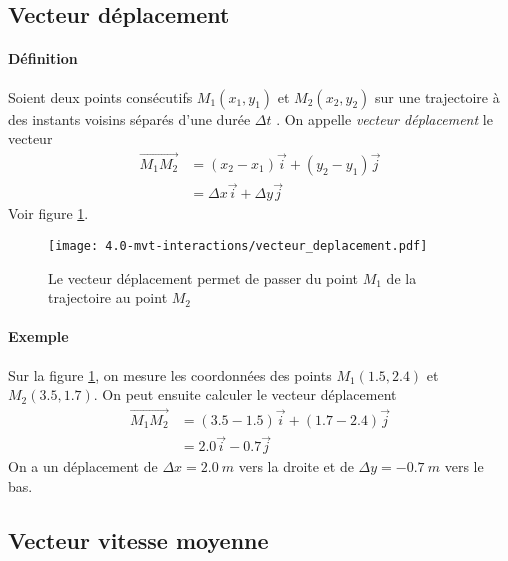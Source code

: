 \subsection{Vecteur déplacement}
\paragraph{Définition} Soient deux points consécutifs $M_1(x_1,y_1)$ et $M_2(x_2,y_2)$  sur une trajectoire à des instants voisins séparés d'une durée $\Delta t$ . On appelle \textit{vecteur déplacement} le vecteur 
\begin{equation*}
  \begin{aligned}
    \overrightarrow{M_1M_2} & = (x_2-x_1) \overrightarrow i + (y_2-y_1) \overrightarrow j \\
			    & = \Delta x \overrightarrow i + \Delta y  \overrightarrow j
 \end{aligned} 
\end{equation*}
Voir figure \ref{fig:vecteur_deplacement}.
\begin{figure}[h!]
  \begin{center}
      \texttt{[image: 4.0-mvt-interactions/vecteur\_deplacement.pdf]}
  \end{center}
  \caption{Le vecteur déplacement permet de passer du point $M_1$ de la trajectoire au point $M_2$}
  \label{fig:vecteur_deplacement}
\end{figure}

\paragraph{Exemple} Sur la figure \ref{fig:vecteur_deplacement}, on mesure les coordonnées des points $M_1 (1.5 , 2.4)$ et $M_2 (3.5,1.7)$. On peut ensuite calculer le vecteur déplacement 
\begin{equation*}
  \begin{aligned}
    \overrightarrow{M_1M_2} &= (3.5-1.5) \overrightarrow {i} + (1.7-2.4) \overrightarrow{ j}\\
		& = 2.0 \overrightarrow{i} - 0.7 \overrightarrow{j}
\end{aligned} 
\end{equation*}
On a un déplacement de $\Delta x = 2.0~m$ vers la droite et de $\Delta y = -0.7~m$ vers le bas.

\subsection{Vecteur vitesse moyenne}
